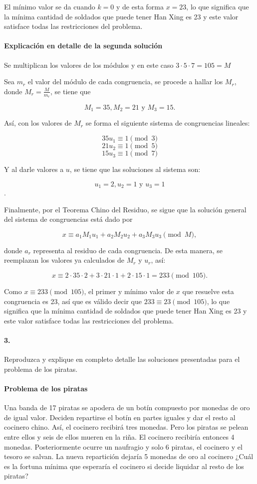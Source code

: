 \documentclass{article}
\begin{document}
	El mínimo valor se da cuando $k=0$ y de esta forma $x=23$, lo que significa que la mínima cantidad de soldados que puede tener Han Xing es 23 y este valor satisface todas las restricciones del problema.
	
	\paragraph{Explicación en detalle de la segunda solución} Se multiplican los valores de los módulos y en este caso $3\cdot 5\cdot 7= 105=M$
	
	Sea $m_r$ el valor del módulo de cada congruencia, se procede a hallar los $M_r$, donde $M_r=\frac{M}{m_r}$, se tiene que
	
	$$M_1=35, M_2=21 \text{ y } M_3=15.$$
	
	Así, con los valores de $M_r$ se forma el siguiente sistema de congruencias lineales:
	
	$$35u_1\equiv 1\pmod{3}$$
	$$21u_2\equiv 1\pmod{5}$$
	$$15u_3\equiv 1\pmod{7}$$
	
	Y al darle valores a $u$, se tiene que las soluciones al sistema son:
	
	$$u_1=2, u_2=1 \text{ y } u_3=1$$.
	
	Finalmente, por el Teorema Chino del Residuo, se sigue que la solución general del sistema de congruencias está dado por
	
	$$x\equiv a_1M_1u_1+a_2M_2u_2+a_3M_3u_3 \pmod{M},$$
	
	donde $a_r$ representa al residuo de cada congruencia. De esta manera, se reemplazan los valores ya calculados de $M_r$ y $u_r$, así:
	
	$$x\equiv 2\cdot35\cdot2+3\cdot21\cdot1+2\cdot15\cdot1=233 \pmod{105}.$$
	
	Como $x\equiv 233 \pmod{105}$, el primer y mínimo valor de $x$ que resuelve esta congruencia es 23, así que es válido decir que $233 \equiv 23 \pmod{105}$, lo que significa que la mínima cantidad de soldados que puede tener Han Xing es 23 y este valor satisface todas las restricciones del problema.
	
	
	\paragraph{3.}  Reproduzca y explique en completo detalle las soluciones presentadas para el problema de los piratas.
	
	\paragraph{Problema de los piratas} Una banda de 17 piratas se apodera de un botín compuesto por monedas de oro de igual valor. Deciden repartirse el botín en partes iguales y dar el resto al cocinero chino. Así, el cocinero recibirá tres monedas. Pero los piratas se pelean entre ellos y seis de ellos mueren en la riña. El cocinero recibiría entonces 4 monedas. Posteriormente ocurre un naufragio y solo 6 piratas, el cocinero y el tesoro se salvan. La nueva repartición dejaría 5 monedas de oro al cocinero ¿Cuál es la fortuna mínima que esperaría el cocinero si decide liquidar al resto de los piratas?
	
\end{document}
